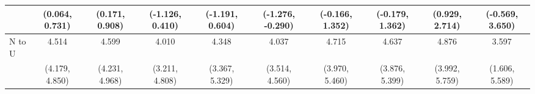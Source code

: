 {\begin{tabular}{l|c|c|c|c|c|c|c|c|c}
& {\scriptsize (0.064, 0.731)}
& {\scriptsize (0.171, 0.908)}
& {\scriptsize (-1.126, 0.410)}
& {\scriptsize (-1.191, 0.604)}
& {\scriptsize (-1.276, -0.290)}
& {\scriptsize (-0.166, 1.352)}
& {\scriptsize (-0.179, 1.362)}
& {\scriptsize (0.929, 2.714)}
& {\scriptsize (-0.569, 3.650)}
\\ [0.1cm]
\hline
N to U
& 4.514 & 4.599 & 4.010 & 4.348 & 4.037 & 4.715 & 4.637 & 4.876 & 3.597 \\
& {\scriptsize (4.179, 4.850)}
& {\scriptsize (4.231, 4.968)}
& {\scriptsize (3.211, 4.808)}
& {\scriptsize (3.367, 5.329)}
& {\scriptsize (3.514, 4.560)}
& {\scriptsize (3.970, 5.460)}
& {\scriptsize (3.876, 5.399)}
& {\scriptsize (3.992, 5.759)}
& {\scriptsize (1.606, 5.589)}
\\ [0.1cm]
\hline
\hline
\end{tabular}
}
